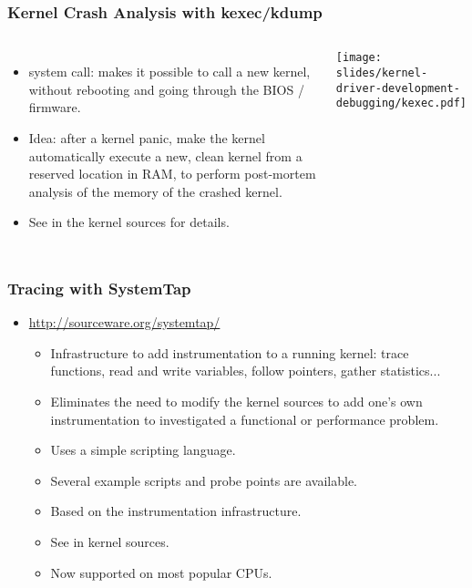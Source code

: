 \begin{frame}
  \frametitle{Kernel Crash Analysis with kexec/kdump}
  \begin{columns}
    \begin{itemize}
    \item {} system call: makes it possible to call a new
      kernel, without rebooting and going through the BIOS / firmware.
    \item Idea: after a kernel panic, make the kernel automatically
      execute a new, clean kernel from a reserved location in RAM, to
      perform post-mortem analysis of the memory of the crashed
      kernel.
    \item See  in the kernel
      sources for details.
    \end{itemize}
    \texttt{[image: slides/kernel-driver-development-debugging/kexec.pdf]}
  \end{columns}
\end{frame}

\begin{frame}
  \frametitle{Tracing with SystemTap}
  \begin{itemize}
  \item \url{http://sourceware.org/systemtap/}
    \begin{itemize}
    \item Infrastructure to add instrumentation to a running kernel:
      trace functions, read and write variables, follow pointers,
      gather statistics...
    \item Eliminates the need to modify the kernel sources to add
      one's own instrumentation to investigated a functional or
      performance problem.
    \item Uses a simple scripting language.
    \item Several example scripts and probe points are available.
    \item Based on the  instrumentation infrastructure.
    \item See  in kernel sources.
    \item Now supported on most popular CPUs.
    \end{itemize}
  \end{itemize}
\end{frame}



